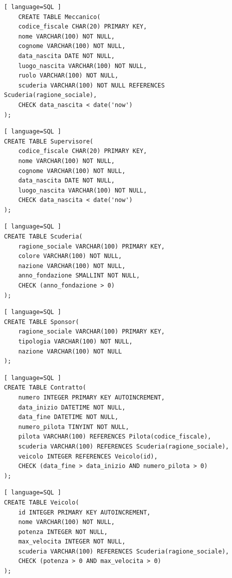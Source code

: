 \documentclass[11pt]{article}
\begin{document}
\begin{lstlisting}[ language=SQL ]
    CREATE TABLE Meccanico(
    codice_fiscale CHAR(20) PRIMARY KEY,
    nome VARCHAR(100) NOT NULL,
    cognome VARCHAR(100) NOT NULL,
    data_nascita DATE NOT NULL,
    luogo_nascita VARCHAR(100) NOT NULL,
    ruolo VARCHAR(100) NOT NULL,
    scuderia VARCHAR(100) NOT NULL REFERENCES Scuderia(ragione_sociale),
    CHECK data_nascita < date('now')
);
\end{lstlisting}

\begin{lstlisting}[ language=SQL ]
CREATE TABLE Supervisore(
    codice_fiscale CHAR(20) PRIMARY KEY,
    nome VARCHAR(100) NOT NULL,
    cognome VARCHAR(100) NOT NULL,
    data_nascita DATE NOT NULL,
    luogo_nascita VARCHAR(100) NOT NULL,
    CHECK data_nascita < date('now')
);
\end{lstlisting}

\begin{lstlisting}[ language=SQL ]
CREATE TABLE Scuderia(
    ragione_sociale VARCHAR(100) PRIMARY KEY,
    colore VARCHAR(100) NOT NULL,
    nazione VARCHAR(100) NOT NULL,
    anno_fondazione SMALLINT NOT NULL,
    CHECK (anno_fondazione > 0)
);
\end{lstlisting}

\begin{lstlisting}[ language=SQL ]
CREATE TABLE Sponsor(
    ragione_sociale VARCHAR(100) PRIMARY KEY,
    tipologia VARCHAR(100) NOT NULL,
    nazione VARCHAR(100) NOT NULL
);
\end{lstlisting}

\begin{lstlisting}[ language=SQL ]
CREATE TABLE Contratto(
    numero INTEGER PRIMARY KEY AUTOINCREMENT,
    data_inizio DATETIME NOT NULL,
    data_fine DATETIME NOT NULL,
    numero_pilota TINYINT NOT NULL,
    pilota VARCHAR(100) REFERENCES Pilota(codice_fiscale),
    scuderia VARCHAR(100) REFERENCES Scuderia(ragione_sociale),
    veicolo INTEGER REFERENCES Veicolo(id),
    CHECK (data_fine > data_inizio AND numero_pilota > 0)
);
\end{lstlisting}

\begin{lstlisting}[ language=SQL ]
CREATE TABLE Veicolo(
    id INTEGER PRIMARY KEY AUTOINCREMENT,
    nome VARCHAR(100) NOT NULL,
    potenza INTEGER NOT NULL,
    max_velocita INTEGER NOT NULL,
    scuderia VARCHAR(100) REFERENCES Scuderia(ragione_sociale),
    CHECK (potenza > 0 AND max_velocita > 0)
);
\end{lstlisting}
\end{document}
